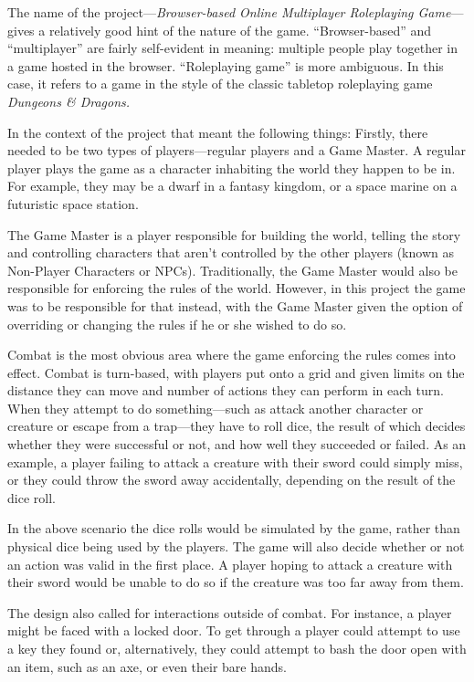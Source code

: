 The name of the project---\textit{Browser-based Online Multiplayer Roleplaying Game}---gives a relatively good hint of the nature of the game. ``Browser-based'' and ``multiplayer'' are fairly self-evident in meaning: multiple people play together in a game hosted in the browser. ``Roleplaying game'' is more ambiguous. In this case, it refers to a game in the style of the classic tabletop roleplaying game \textit{Dungeons \& Dragons.}

In the context of the project that meant the following things: Firstly, there needed to be two types of players---regular players and a Game Master. A regular player plays the game as a character inhabiting the world they happen to be in. For example, they may be a dwarf in a fantasy kingdom, or a space marine on a futuristic space station.

The Game Master is a player responsible for building the world, telling the story and controlling characters that aren't controlled by the other players (known as Non-Player Characters or NPCs). Traditionally, the Game Master would also be responsible for enforcing the rules of the world. However, in this project the game was to be responsible for that instead, with the Game Master given the option of overriding or changing the rules if he or she wished to do so.

Combat is the most obvious area where the game enforcing the rules comes into effect. Combat is turn-based, with players put onto a grid and given limits on the distance they can move and number of actions they can perform in each turn. When they attempt to do something---such as attack another character or creature or escape from a trap---they have to roll dice, the result of which decides whether they were successful or not, and how well they succeeded or failed. As an example, a player failing to attack a creature with their sword could simply miss, or they could throw the sword away accidentally, depending on the result of the dice roll.

In the above scenario the dice rolls would be simulated by the game, rather than physical dice being used by the players. The game will also decide whether or not an action was valid in the first place. A player hoping to attack a creature with their sword would be unable to do so if the creature was too far away from them.

The design also called for interactions outside of combat. For instance, a player might be faced with a locked door. To get through a player could attempt to use a key they found or, alternatively, they could attempt to bash the door open with an item, such as an axe, or even their bare hands.


